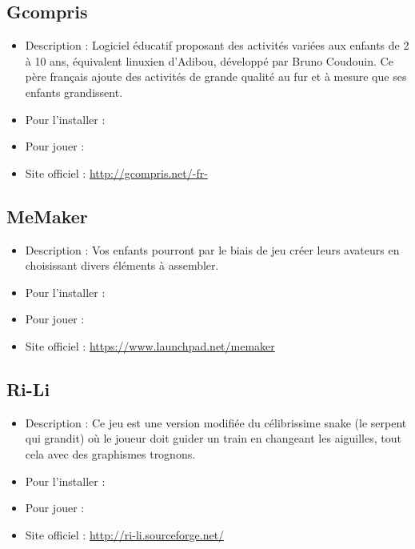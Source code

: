\subsection{Gcompris}
\begin{itemize}
\begingroup
{}
\item Description : Logiciel éducatif proposant des activités variées aux enfants de 2 à 10 ans, équivalent linuxien d'Adibou, développé par Bruno Coudouin. Ce père français ajoute des activités de grande qualité au fur et à mesure que ses enfants grandissent.{\par}
\endgroup
\item Pour l'installer : 
\item Pour jouer : 
\item Site officiel : \url{http://gcompris.net/-fr-}{\par}
\end{itemize}
\subsection{MeMaker}
\begin{itemize}
\begingroup
{}
\item Description : Vos enfants pourront par le biais de jeu créer leurs avateurs en choisissant divers éléments à assembler.{\par}
\item Pour l'installer : 
\item Pour jouer : 
\item Site officiel : \url{https://www.launchpad.net/memaker}{\par}
\endgroup
\end{itemize}
\subsection{Ri-Li}
\begin{itemize}
\begingroup
{}
\item Description : Ce jeu est une version modifiée du célibrissime snake (le serpent qui grandit) où le joueur doit guider un train en changeant les aiguilles, tout cela avec des graphismes trognons.{\par}
\item Pour l'installer : 
\item Pour jouer : 
\item Site officiel : \url{http://ri-li.sourceforge.net/}{\par}
\endgroup
\end{itemize}
